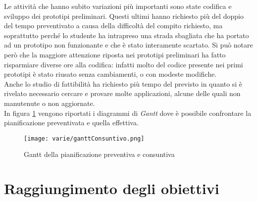Le attività che hanno subito variazioni più importanti sono state codifica e sviluppo dei prototipi preliminari. Questi ultimi hanno richiesto più del doppio del tempo preventivato a causa della difficoltà del compito richiesto, ma soprattutto perché lo studente ha intrapreso una strada sbagliata che ha portato ad un prototipo non funzionante e che è stato interamente scartato. Si può notare però che la maggiore attenzione riposta nei prototipi preliminari ha fatto risparmiare diverse ore alla codifica: infatti molto del codice presente nei primi prototipi è stato riusato senza cambiamenti, o con modeste modifiche.\\
Anche lo studio di fattibilità ha richiesto più tempo del previsto in quanto si è rivelato necessario cercare e provare molte applicazioni, alcune delle quali non manutenute o non aggiornate.\\
In figura \ref{gantt:pianificazione} vengono riportati i diagrammi di \emph{Gantt} dove è possibile confrontare la pianificazione preventivata e quella effettiva.

\begin{figure}[H] 
    \centering 
    \texttt{[image: varie/ganttConsuntivo.png]} 
    \caption{Gantt della pianificazione preventiva e consuntiva}
    \label{gantt:pianificazione}
\end{figure}

\section{Raggiungimento degli obiettivi}
